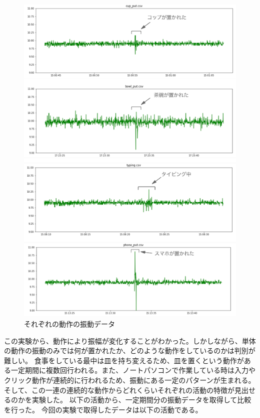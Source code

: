 \begin{figure}[htbp]
  \caption{それぞれの動作の振動データ}
  \label{fig:actions_vibration}
  \begin{center}
    \includegraphics[bb=0 0 700 800,width=20cm]{assets/actions_vibration.png}
  \end{center}
\end{figure}

この実験から、動作により振幅が変化することがわかった。しかしながら、単体の動作の振動のみでは何が置かれたか、どのような動作をしているのかは判別が難しい。
食事をしている最中は皿を持ち変えるため、皿を置くという動作がある一定期間に複数回行われる。また、ノートパソコンで作業している時は入力やクリック動作が連続的に行われるため、振動にある一定のパターンが生まれる。
そして、この一連の連続的な動作からどれくらいそれぞれの活動の特徴が見出せるのかを実験した。
以下の活動から、一定期間分の振動データを取得して比較を行った。
今回の実験で取得したデータは以下の活動である。

